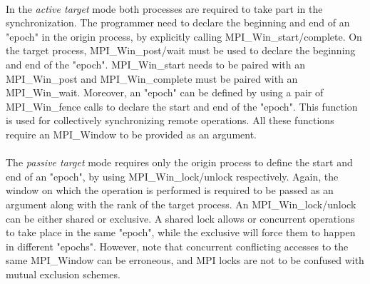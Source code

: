 \paragraph{}
In the \emph{active target} mode both processes are required to take part in the synchronization.  The programmer 
need to declare the beginning and end of an "epoch" in the origin process, by explicitly calling MPI\_Win\_start/complete.
On the target process, MPI\_Win\_post/wait must be used to declare the beginning and end of the "epoch".  MPI\_Win\_start needs
to be paired with an MPI\_Win\_post and MPI\_Win\_complete must be paired with an MPI\_Win\_wait.  Moreover, an "epoch" can be 
defined by using a pair of MPI\_Win\_fence calls to declare the start and end of the "epoch".  This function is used for 
collectively synchronizing remote operations.  All these functions require an MPI\_Window to be provided as an argument. 

\paragraph{}
The \emph{passive target} mode requires only the origin process to define the start and end of an "epoch", by using 
MPI\_Win\_lock/unlock respectively.  Again, the window on which the operation is performed is required to be passed as
an argument along with the rank of the target process.  An MPI\_Win\_lock/unlock can be either shared or exclusive.
A shared lock allows or concurrent operations to take place in the same "epoch", while the exclusive will force them
to happen in different "epochs".  However, note that concurrent conflicting accesses to the same MPI\_Window can be 
erroneous, and MPI locks are not to be confused with mutual exclusion schemes.
 

